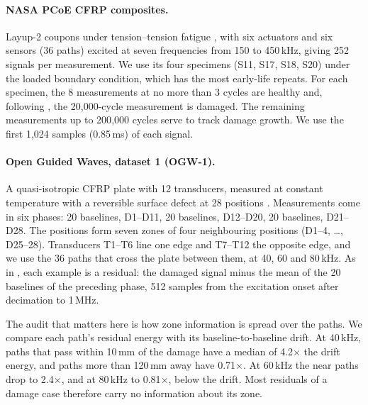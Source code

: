 \documentclass{article}
\begin{document}
\paragraph{NASA PCoE CFRP composites.}
Layup-2 coupons under tension--tension fatigue \citep{saxena2008nasa}, with six actuators and six
sensors (36 paths) excited at seven frequencies from 150 to 450\,kHz, giving 252 signals per measurement.
We use its four specimens (S11, S17, S18, S20) under the loaded boundary condition, which has the most
early-life repeats. For each specimen, the 8 measurements at no more than 3 cycles are healthy and, following
\citet{rautela2022delamination}, the 20{,}000-cycle measurement is damaged. The remaining measurements up to
200{,}000 cycles serve to track damage growth. We use the first 1{,}024 samples (0.85\,ms) of each signal.

\paragraph{Open Guided Waves, dataset 1 (OGW-1).}
A quasi-isotropic CFRP plate with 12 transducers, measured at constant temperature with a reversible
surface defect at 28 positions \citep{moll2019ogw}. Measurements come in six phases: 20 baselines,
D1--D11, 20 baselines, D12--D20, 20 baselines, D21--D28. The positions form seven zones of four
neighbouring positions (D1--4, \dots, D25--28). Transducers T1--T6 line one edge and T7--T12 the
opposite edge, and we use the 36 paths that cross the plate between them, at 40, 60 and 80\,kHz. As in
\citet{rautela2021combined}, each example is a residual: the damaged signal minus the mean of the 20
baselines of the preceding phase, 512 samples from the excitation onset after decimation to 1\,MHz.

The audit that matters here is how zone information is spread over the paths. We compare each path's
residual energy with its baseline-to-baseline drift. At 40\,kHz, paths that pass within 10\,mm of the
damage have a median of 4.2$\times$ the drift energy, and paths more than 120\,mm away have 0.71$\times$.
At 60\,kHz the near paths drop to 2.4$\times$, and at 80\,kHz to 0.81$\times$, below the drift. Most
residuals of a damage case therefore carry no information about its zone.
\end{document}
